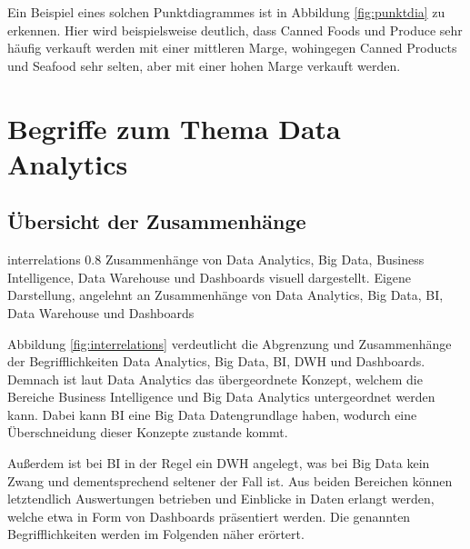 \begin{description}
Ein Beispiel eines solchen Punktdiagrammes ist in Abbildung \ref{fig:punktdia} zu erkennen.
Hier wird beispielsweise deutlich, dass \glqq Canned Foods\grqq{} und \glqq Produce\grqq{} sehr häufig verkauft werden mit einer mittleren Marge, wohingegen \glqq Canned Products\grqq{} und \glqq Seafood\grqq{} sehr selten, aber mit einer hohen Marge verkauft werden.
\end{description}


\section{Begriffe zum Thema Data Analytics}
\subsection{Übersicht der Zusammenhänge}

\bild
{interrelations}
{0.8\textwidth}
{Zusammenhänge von Data Analytics, Big Data, Business Intelligence, Data Warehouse und Dashboards visuell dargestellt. Eigene Darstellung, angelehnt an \cite{Dedic.2017}}
{Zusammenhänge von Data Analytics, Big Data, BI, Data Warehouse und Dashboards}

Abbildung \ref{fig:interrelations} verdeutlicht die Abgrenzung und Zusammenhänge der Begrifflichkeiten Data Analytics, Big Data, \gls{BI}, \gls{DWH} und Dashboards.
Demnach ist laut \cite{Dedic.2017} Data Analytics das übergeordnete Konzept, welchem die Bereiche Business Intelligence und Big Data Analytics untergeordnet werden kann.
Dabei kann \gls{BI} eine Big Data Datengrundlage haben, wodurch eine Überschneidung dieser Konzepte zustande kommt.

Außerdem ist bei BI in der Regel ein \gls{DWH} angelegt, was bei Big Data kein Zwang und dementsprechend seltener der Fall ist.
Aus beiden Bereichen können letztendlich Auswertungen betrieben und Einblicke in Daten erlangt werden, welche etwa in Form von Dashboards präsentiert werden.
Die genannten Begrifflichkeiten werden im Folgenden näher erörtert. 
